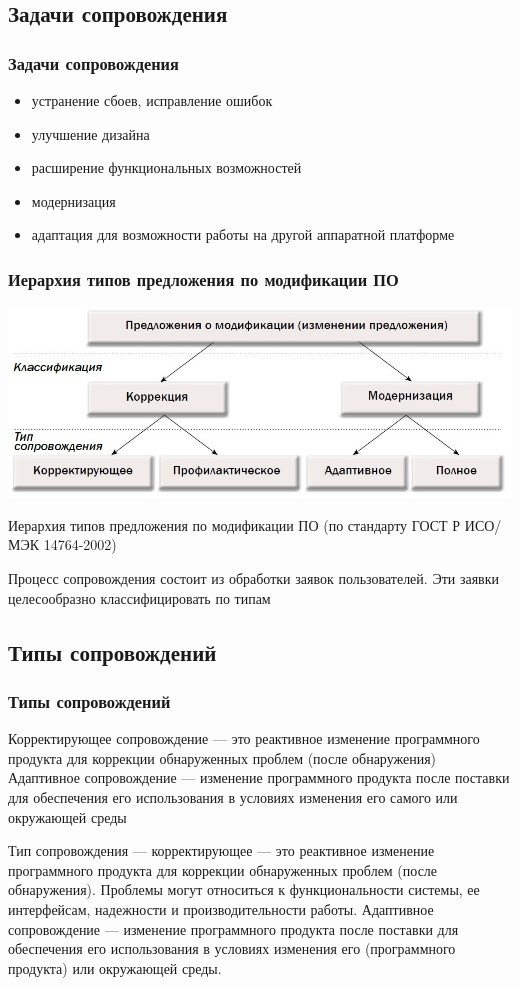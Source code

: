 \documentclass{../industrial-development}
\begin{document}
\subsection{Задачи сопровождения}
\begin{frame} \frametitle{Задачи сопровождения}
	\begin{itemize}
		\item устранение сбоев, исправление ошибок
		\item улучшение дизайна 
		\item расширение функциональных возможностей 
		\item модернизация
		\item адаптация для возможности работы на другой аппаратной платформе
	\end{itemize}
\end{frame}

\lecturenotes

\begin{frame} \frametitle{Иерархия типов предложения по модификации ПО}
\centerline{\includegraphics[width=\textwidth]{pic20.jpg}}
Иерархия типов предложения по модификации ПО (по стандарту ГОСТ Р ИСО/МЭК 14764-2002)
\end{frame}
\lecturenotes
Процесс сопровождения состоит из обработки заявок пользователей. Эти заявки целесообразно классифицировать по типам

\subsection{Типы сопровождений}
\begin{frame} \frametitle{Типы сопровождений}
	\begin{definition}
		\alert{Корректирующее сопровождение} --- это реактивное изменение программного продукта для коррекции обнаруженных проблем (после обнаружения)
		\newline
		\newline
		\alert{Адаптивное сопровождение} --- изменение программного продукта после поставки для обеспечения его использования в условиях изменения его самого или окружающей среды
	\end{definition}
\end{frame}
\lecturenotes
Тип сопровождения — корректирующее — это реактивное изменение программного продукта для коррекции обнаруженных проблем (после обнаружения). Проблемы могут относиться к функциональности системы, ее интерфейсам, надежности и производительности работы.
Адаптивное сопровождение — изменение программного продукта после поставки для обеспечения его использования в условиях изменения его (программного продукта) или окружающей среды.
\end{document}
